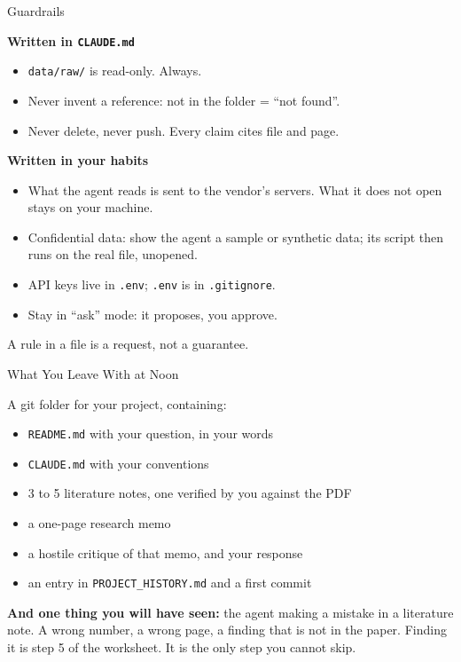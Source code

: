 \documentclass[svgnames,x11names,dvipsnames]{beamer}
\begin{document}
\begin{frame}{Guardrails}

\small
\textbf{Written in \texttt{CLAUDE.md}}
\begin{itemize}
    \item \texttt{data/raw/} is read-only. Always.
    \item Never invent a reference: not in the folder = ``not found''.
    \item Never delete, never push. Every claim cites file and page.
\end{itemize}

\vspace{0.2cm}

\textbf{Written in your habits}
\begin{itemize}
    \item What the agent reads is sent to the vendor's servers. What it does not open stays on your machine.
    \item \alert{Confidential data: show the agent a sample or synthetic data; its script then runs on the real file, unopened.}
    \item API keys live in \texttt{.env}; \texttt{.env} is in \texttt{.gitignore}.
    \item Stay in ``ask'' mode: it proposes, you approve.
\end{itemize}

\vspace{0.2cm}

\centering
\normalsize
A rule in a file is a request, not a guarantee.

\end{frame}

\begin{frame}{What You Leave With at Noon}

A git folder for your project, containing:
\begin{itemize}
    \item \texttt{README.md} with your question, in your words
    \item \texttt{CLAUDE.md} with your conventions
    \item 3 to 5 literature notes, one verified by you against the PDF
    \item a one-page research memo
    \item a hostile critique of that memo, and your response
    \item an entry in \texttt{PROJECT\_HISTORY.md} and a first commit
\end{itemize}

\vspace{0.3cm}

\textbf{And one thing you will have seen:} the agent making a mistake in a literature note. A wrong number, a wrong page, a finding that is not in the paper.
Finding it is step 5 of the worksheet. \alert{It is the only step you cannot skip.}

\end{frame}
\end{document}
